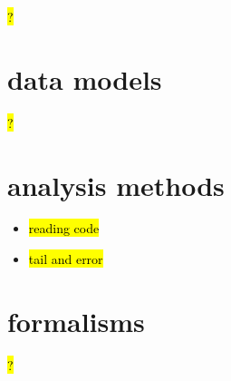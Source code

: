 \hl{?}

\section{data models}

\hl{?}

\section{analysis methods}

\begin{itemize}
\item \hl{reading code}
\item \hl{tail and error}
\end{itemize}

\section{formalisms}

\hl{?}